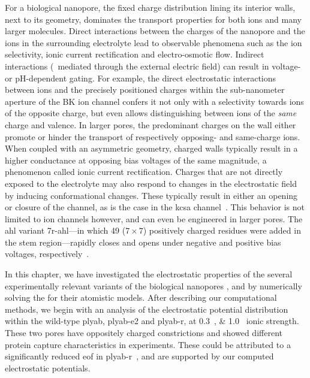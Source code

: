 For a biological nanopore, the fixed charge distribution lining its interior walls, next to its geometry,
dominates the transport properties for both ions and many larger molecules. Direct interactions between the
charges of the nanopore and the ions in the surrounding electrolyte lead to observable phenomena such as the
ion selectivity, ionic current rectification and electro-osmotic flow. Indirect interactions (\ie~mediated
through the external electric field) can result in voltage- or pH-dependent gating. For example, the direct
electrostatic interactions between ions and the precisely positioned charges within the sub-nanometer aperture
of the BK ion channel confers it not only with a selectivity towards ions of the opposite charge, but even
allows distinguishing between ions of the \emph{same} charge and valence. In larger pores, the predominant
charges on the wall either promote or hinder the transport of respectively opposing- and same-charge ions.
When coupled with an asymmetric geometry, charged walls typically result in a higher conductance at opposing
bias voltages of the same magnitude, a phenomenon called ionic current rectification. Charges that are not
directly exposed to the electrolyte may also respond to changes in the electrostatic field by inducing
conformational changes. These typically result in either an opening or closure of the channel, as is the case
in the \gls{kcsa} channel~\cite{Kopec-2019}. This behavior is not limited to ion channels however, and can
even be engineered in larger pores. The \gls{ahl} variant \gls{7r-ahl}---in which 49 ($7\times7$) positively
charged residues were added in the stem region---rapidly closes and opens under negative and positive bias
voltages, respectively~\cite{Maglia-2009}.


In this chapter, we have investigated the electrostatic properties of the several experimentally relevant
variants of the biological nanopores ,  and  by numerically
solving the  for their atomistic models. After describing our computational methods, we begin
with an analysis of the electrostatic potential distribution within the wild-type \gls{plyab}, \gls{plyab-e2}
and \gls{plyab-r}, at \SIlist{0.3;1.0}{\Molar} ionic strength. These two pores have oppositely charged
constrictions and showed different protein capture characteristics in experiments. These could be attributed
to a significantly reduced \gls{eof} in \gls{plyab-r}~\cite{Huang-2020}, and are supported by our computed
electrostatic potentials.

